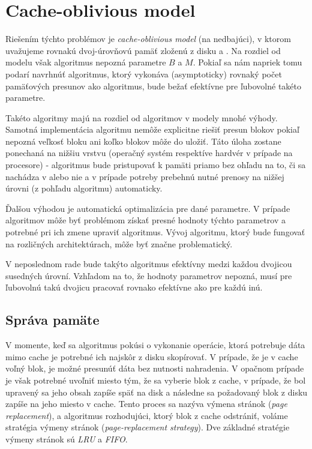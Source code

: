 \section{Cache-oblivious model}
Riešením týchto problémov je \emph{cache-oblivious model} (na \cache nedbajúci), v ktorom uvažujeme rovnakú dvoj-úrovňovú pamäť zloženú z disku a \cache \citep{frigo1999cache,prokop1999cache}. Na rozdiel od \aware modelu však algoritmus nepozná parametre $B$ a $M$. Pokiaľ sa nám napriek tomu podarí navrhnúť algoritmus, ktorý vykonáva (asymptoticky) rovnaký počet pamäťových presunov ako \aware algoritmus, bude bežať efektívne pre ľubovolné takéto parametre.

Takéto algoritmy majú na rozdiel od \aware algoritmov v \extmem modely mnohé výhody. Samotná implementácia algoritmu nemôže explicitne riešiť presun blokov pokiaľ nepozná veľkosť bloku ani koľko blokov môže do \cache uložiť. Táto úloha zostane ponechaná na nižšiu vrstvu (operačný systém respektíve hardvér v prípade \cache na procesore) - algoritmus bude pristupovať k pamäti priamo bez ohľadu na to, či sa nachádza v \cache alebo nie a v prípade potreby prebehnú nutné prenosy na nižšej úrovni (z pohľadu algoritmu) automaticky.

Ďalšou výhodou je automatická optimalizácia pre dané parametre. V prípade \aware algoritmov môže byť problémom získať presné hodnoty týchto parametrov a potrebné pri ich zmene upraviť algoritmus. Vývoj algoritmu, ktorý bude fungovať na rozličných architektúrach, môže byť značne problematický.

V neposlednom rade bude takýto \obliv algoritmus efektívny medzi každou dvojicou susedných úrovní. Vzhľadom na to, že hodnoty parametrov nepozná, musí pre ľubovolnú takú dvojicu pracovať rovnako efektívne ako pre každú inú.


\subsection{Správa pamäte} \label{sec:memmng}
V momente, keď sa \obliv algoritmus pokúsi o vykonanie operácie, ktorá potrebuje dáta mimo cache je potrebné ich najskôr z disku skopírovať. V prípade, že je v cache voľný blok, je možné presunúť dáta bez nutnosti nahradenia. V opačnom prípade je však potrebné uvoľniť miesto tým, že sa vyberie blok z cache, v prípade, že bol upravený sa jeho obsah zapíše späť na disk a následne sa požadovaný blok z disku zapíše na jeho miesto v cache. Tento proces sa nazýva výmena stránok ({\em page replacement}), a algoritmus rozhodujúci, ktorý blok z cache odstrániť, voláme stratégia výmeny stránok ({\em page-replacement strategy}). Dve základné stratégie výmeny stránok sú \emph{LRU} a \emph{FIFO}.

